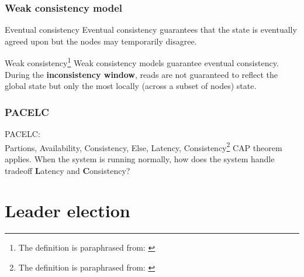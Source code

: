 \documentclass[10pt]{beamer}
\begin{document}
\begin{frame}
  \frametitle{Weak consistency model}
  \begin{alertblock}{Eventual consistency \cite{pedersenConsistencyDistributedPervasive2022}}
    Eventual consistency guarantees that the state is eventually agreed upon but the nodes may temporarily disagree.
  \end{alertblock}
  \begin{alertblock}{Weak consistency\footnote{The definition is paraphrased from: \cite{pedersenConsistencyDistributedPervasive2022}}}
    Weak consistency models guarantee eventual consistency. During the \textbf{inconsistency window}, reads are not guaranteed to reflect the global state but only the most locally (across a subset of nodes) state.
  \end{alertblock}

\end{frame}

\begin{frame}
  \frametitle{PACELC}
  \begin{alertblock}{PACELC:\\Partions, Availability, Consistency, Else, Latency, Consistency\footnote{The definition is paraphrased from: \cite{pedersenConsistencyDistributedPervasive2022}}}
    CAP theorem applies. When the system is running normally, how does the system handle tradeoff \textbf{L}atency and \textbf{C}onsistency?
  \end{alertblock}
\end{frame}

\section{Leader election}
\end{document}
